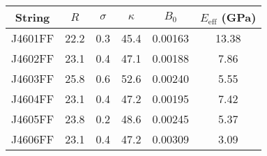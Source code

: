 \begin{tabular}{cccccc}
\toprule
String & $R$ & $\sigma$ & $\kappa$ & $B_0$ & $E_\mathrm{eff}$ (GPa) \\
\midrule
J4601FF & 22.2 & 0.3 & 45.4 & 0.00163 & 13.38 \\
J4602FF & 23.1 & 0.4 & 47.1 & 0.00188 & 7.86 \\
J4603FF & 25.8 & 0.6 & 52.6 & 0.00240 & 5.55 \\
J4604FF & 23.1 & 0.4 & 47.2 & 0.00195 & 7.42 \\
J4605FF & 23.8 & 0.2 & 48.6 & 0.00245 & 5.37 \\
J4606FF & 23.1 & 0.4 & 47.2 & 0.00309 & 3.09 \\
\bottomrule
\end{tabular}
